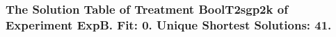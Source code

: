  \begin{frame}
 \fontsize{8pt}{9pt}\selectfont
 \frametitle{ The Solution Table of Treatment BoolT2sgp2k of Experiment ExpB. Fit: 0. Unique Shortest Solutions: 41. }

 \label{ExpBSolutionTable010.tex}  
 \end{frame}

